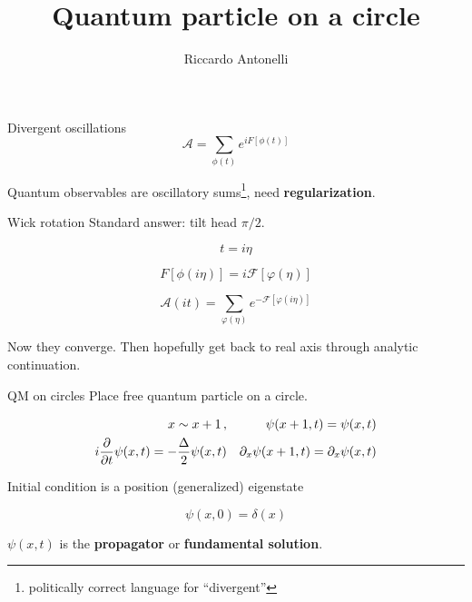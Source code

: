 \documentclass{beamer}
\title{Quantum particle on a circle}
\author{Riccardo Antonelli}
\begin{document}
\begin{frame}
    \maketitle
\end{frame}

\begin{frame}{Divergent oscillations}
\begin{equation*}
    \mathcal{A} = \sum_{\phi(t)} e^{iF[\phi(t)]}
    \label{}
\end{equation*}

Quantum observables are oscillatory sums\footnote{politically correct language for ``divergent''}, need \textbf{regularization}.

\end{frame}

\newcommand{\imt}{\eta}

\begin{frame}{Wick rotation}
    Standard answer: tilt head $\pi/2$.

    \begin{equation}
        t = i\imt
        \label{}
    \end{equation}

    \begin{equation}
        F[\phi(i\imt)] = i \mathcal{F}[\varphi(\imt)]
        \label{}
    \end{equation}

    \begin{equation}
        \mathcal{A}(it) = \sum_{\varphi(\imt)} e^{-\mathcal{F}[\varphi(i\imt)]}
        \label{}
    \end{equation}

    Now they converge. Then hopefully get back to real axis through analytic continuation.
\end{frame}

\begin{frame}{QM on circles}
    Place free quantum particle on a circle.

    \begin{align}
        x \sim x + 1\,, && \psi(x+1,t) = \psi(x,t)\\
        i \pdv{t} \psi(x,t) = - {\Delta \over 2} \psi(x,t) && \partial_x \psi(x+1,t) = \partial_x \psi(x,t)
        \label{}
    \end{align}
    
    Initial condition is a position (generalized) eigenstate

    \begin{equation}
        \psi(x,0) = \delta(x)
        \label{}
    \end{equation}

    $\psi(x,t)$ is the \textbf{propagator} or \textbf{fundamental solution}.

\end{frame}
\end{document}
